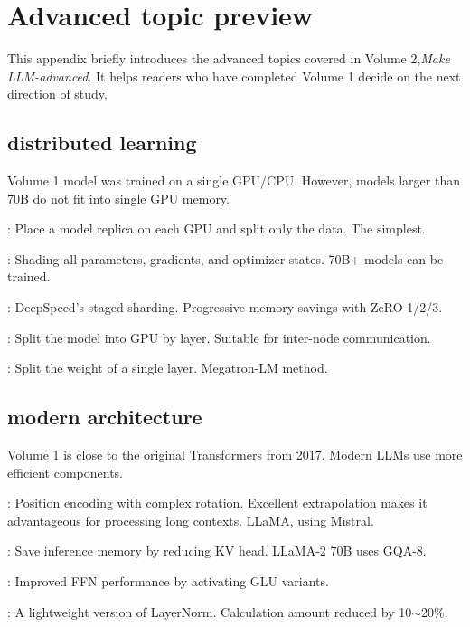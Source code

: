 \chapter{Advanced topic preview}
\label{app:advanced_preview}

This appendix briefly introduces the advanced topics covered in Volume 2,\textit{Make LLM-advanced}. It helps readers who have completed Volume 1 decide on the next direction of study.

\section{distributed learning}

Volume 1 model was trained on a single GPU/CPU. However, models larger than 70B do not fit into single GPU memory.

: Place a model replica on each GPU and split only the data. The simplest.

: Shading all parameters, gradients, and optimizer states. 70B+ models can be trained.

: DeepSpeed’s staged sharding. Progressive memory savings with ZeRO-1/2/3.

: Split the model into GPU by layer. Suitable for inter-node communication.

: Split the weight of a single layer. Megatron-LM method.

\section{modern architecture}

Volume 1 is close to the original Transformers from 2017. Modern LLMs use more efficient components.

: Position encoding with complex rotation. Excellent extrapolation makes it advantageous for processing long contexts. LLaMA, using Mistral.

: Save inference memory by reducing KV head. LLaMA-2 70B uses GQA-8.

: Improved FFN performance by activating GLU variants.

: A lightweight version of LayerNorm. Calculation amount reduced by 10$\sim$20\%.

